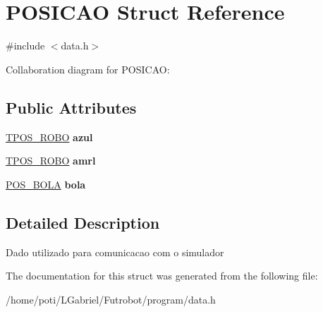 \hypertarget{structPOSICAO}{}\section{P\+O\+S\+I\+C\+AO Struct Reference}
\label{structPOSICAO}


{\ttfamily \#include $<$data.\+h$>$}



Collaboration diagram for P\+O\+S\+I\+C\+AO\+:
\subsection*{Public Attributes}
\begin{DoxyCompactItemize}
\item 
\hyperlink{structTPOS__ROBO}{T\+P\+O\+S\+\_\+\+R\+O\+BO} {\bfseries azul}\hypertarget{structPOSICAO_a078be0dd80bcd72df55aae7ddecf564a}{}\label{structPOSICAO_a078be0dd80bcd72df55aae7ddecf564a}

\item 
\hyperlink{structTPOS__ROBO}{T\+P\+O\+S\+\_\+\+R\+O\+BO} {\bfseries amrl}\hypertarget{structPOSICAO_a5846642ac2356affb930ee60ac0164c6}{}\label{structPOSICAO_a5846642ac2356affb930ee60ac0164c6}

\item 
\hyperlink{structPOS__BOLA}{P\+O\+S\+\_\+\+B\+O\+LA} {\bfseries bola}\hypertarget{structPOSICAO_a660cd4be96ea77e7438aea4d66aad36b}{}\label{structPOSICAO_a660cd4be96ea77e7438aea4d66aad36b}

\end{DoxyCompactItemize}


\subsection{Detailed Description}
Dado utilizado para comunicacao com o simulador 

The documentation for this struct was generated from the following file\+:\begin{DoxyCompactItemize}
\item 
/home/poti/\+L\+Gabriel/\+Futrobot/program/data.\+h\end{DoxyCompactItemize}
